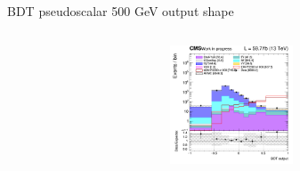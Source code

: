 \documentclass[8pt]{beamer}
\begin{document}
\begin{frame}{BDT pseudoscalar 500 GeV output shape}
\begin{columns}
\begin{column}{0.33\textwidth}
\begin{center}
			\begin{block}{}\end{block}	
     			\includegraphics[width=1.0\textwidth, height=100pt]{figs/2018/SmearSR-ttDM-pseudo500/log_cratio_ST_topCR_ll_BDT_ttDM500_ST_BDT_output_pseudoscalar500_customBinsAttempt7.png}
    		\end{center}		
		\end{column}
\end{columns}


\end{frame}
\end{document}
